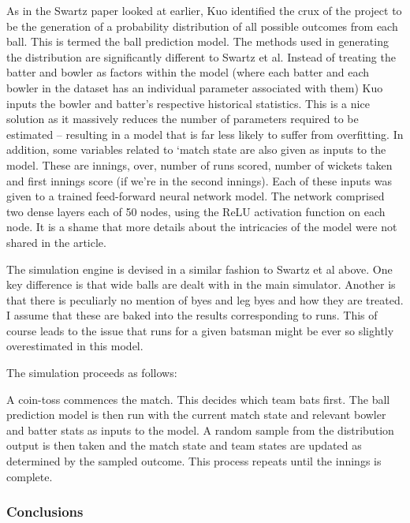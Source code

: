 As in the Swartz paper looked at earlier, Kuo identified the crux of the project to be the generation of a probability distribution of all possible outcomes from each ball. This is termed the ball prediction model. The methods used in generating the distribution are significantly different to Swartz et al. Instead of treating the batter and bowler as factors within the model (where each batter and each bowler in the dataset has an individual parameter associated with them) Kuo inputs the bowler and batter’s respective historical statistics. This is a nice solution as it massively reduces the number of parameters required to be estimated – resulting in a model that is far less likely to suffer from overfitting. \cite{everitt_cambridge_2010} In addition, some variables related to ‘match state are also given as inputs to the model. These are innings, over, number of runs scored, number of wickets taken and first innings score (if we’re in the second innings). Each of these inputs was given to a trained feed-forward neural network model. The network comprised two dense layers each of 50 nodes, using the ReLU activation function on each node. It is a shame that more details about the intricacies of the model were not shared in the article.

The simulation engine is devised in a similar fashion to Swartz et al above. One key difference is that wide balls are dealt with in the main simulator. Another is that there is peculiarly no mention of byes and leg byes and how they are treated. I assume that these are baked into the results corresponding to runs. This of course leads to the issue that runs for a given batsman might be ever so slightly overestimated in this model.\footnotemark{}


The simulation proceeds as follows:

A coin-toss commences the match. This decides which team bats first. The ball prediction model is then run with the current match state and relevant bowler and batter stats as inputs to the model. A random sample from the distribution output is then taken and the match state and team states are updated as determined by the sampled outcome. This process repeats until the innings is complete.

\subsubsection{Conclusions}

